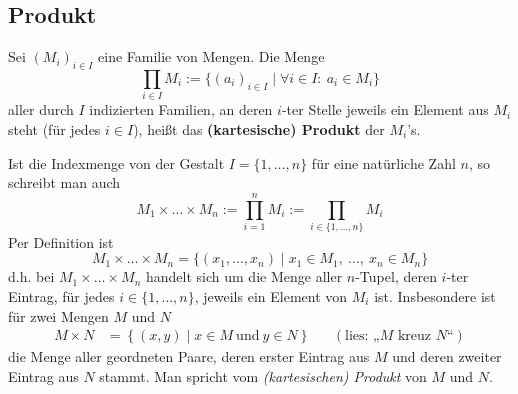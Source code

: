 \subsection*{Produkt}


\begin{defin}  
    Sei $(M_i)_{i\in I}$ eine Familie von Mengen. Die Menge
        \[ \prod_{i\in I} M_i := \{ (a_i)_{i\in I} \mid \forall i\in I:\ a_i\in M_i \} \]
    aller durch $I$ indizierten Familien, an deren $i$-ter Stelle jeweils ein Element aus $M_i$ steht (für jedes $i\in I$), heißt das \textbf{(kartesische) Produkt} der $M_i$'s.

    Ist die Indexmenge von der Gestalt $I=\{1,\dots , n\}$ für eine natürliche Zahl $n$, so schreibt man auch
        \[ M_1\times\ldots\times M_n := \prod_{i=1}^n M_i := \prod_{i\in \{1,\dots , n\}} M_i   \]
    Per Definition ist
        \[ M_1\times\ldots\times M_n = \{ (x_1,\dots , x_n) \mid x_1\in M_1,\ \ldots,\ x_n\in M_n \} \]
    d.h. bei $M_1\times\ldots\times M_n$ handelt sich um die Menge aller $n$-Tupel, deren $i$-ter Eintrag, für jedes $i\in \{1,\dots , n\}$, jeweils ein Element von $M_i$ ist.
    Insbesondere ist für zwei Mengen $M$ und $N$
    \begin{align*}
        M \times N & = \left\{ (x,y) \mid x\in M\ \text{und}\ y\in N \right\}  && (\text{lies: „$M$ kreuz $N$“})
    \end{align*}
    die Menge aller geordneten Paare, deren erster Eintrag aus $M$ und deren zweiter Eintrag aus $N$ stammt. Man spricht vom \emph{(kartesischen) Produkt} von $M$ und $N$.
\end{defin}


